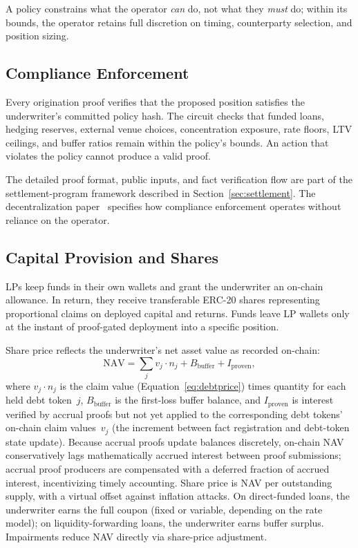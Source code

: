A policy constrains what the operator \emph{can} do, not what they \emph{must} do; within its bounds, the operator retains full discretion on timing, counterparty selection, and position sizing.

\subsection{Compliance Enforcement}

Every origination proof verifies that the proposed position satisfies the underwriter's committed policy hash. The circuit checks that funded loans, hedging reserves, external venue choices, concentration exposure, rate floors, LTV ceilings, and buffer ratios remain within the policy's bounds. An action that violates the policy cannot produce a valid proof.

The detailed proof format, public inputs, and fact verification flow are part of the settlement-program framework described in Section~\ref{sec:settlement}. The decentralization paper~\cite{daloc-decent2026} specifies how compliance enforcement operates without reliance on the operator.

\subsection{Capital Provision and Shares}

LPs keep funds in their own wallets and grant the underwriter an on-chain allowance. In return, they receive transferable ERC-20 shares representing proportional claims on deployed capital and returns. Funds leave LP wallets only at the instant of proof-gated deployment into a specific position.

Share price reflects the underwriter's net asset value as recorded on-chain:
\begin{equation}
  \mathrm{NAV} = \sum_{j} v_j \cdot n_j + B_{\mathrm{buffer}} + I_{\mathrm{proven}},
  \label{eq:nav}
\end{equation}
where $v_j \cdot n_j$ is the claim value (Equation~\ref{eq:debtprice}) times quantity for each held debt token~$j$, $B_{\mathrm{buffer}}$ is the first-loss buffer balance, and $I_{\mathrm{proven}}$ is interest verified by accrual proofs but not yet applied to the corresponding debt tokens' on-chain claim values~$v_j$ (the increment between fact registration and debt-token state update). Because accrual proofs update balances discretely, on-chain NAV conservatively lags mathematically accrued interest between proof submissions; accrual proof producers are compensated with a deferred fraction of accrued interest, incentivizing timely accounting. Share price is NAV per outstanding supply, with a virtual offset against inflation attacks. On direct-funded loans, the underwriter earns the full coupon (fixed or variable, depending on the rate model); on liquidity-forwarding loans, the underwriter earns buffer surplus. Impairments reduce NAV directly via share-price adjustment.

